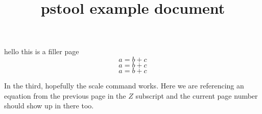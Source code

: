 \documentclass[12pt]{memoir}
\begin{document}
\title{\textsf{pstool} example document}
\maketitle

\begin{center}
\end{center}


\frontmatter
hello this is a filler page
\begin{equation}
a=b+c\label{eq1}
\end{equation}
\begin{equation}
a=b+c\label{eq2}
\end{equation}
\begin{equation}
a=b+c\label{eq3}
\end{equation}

\newpage
In the third, hopefully the scale command works.
Here we are referencing an equation from the previous page in the $Z$ subscript and the current page number should show up in there too.

\begin{center}
\end{center}
\end{document}

